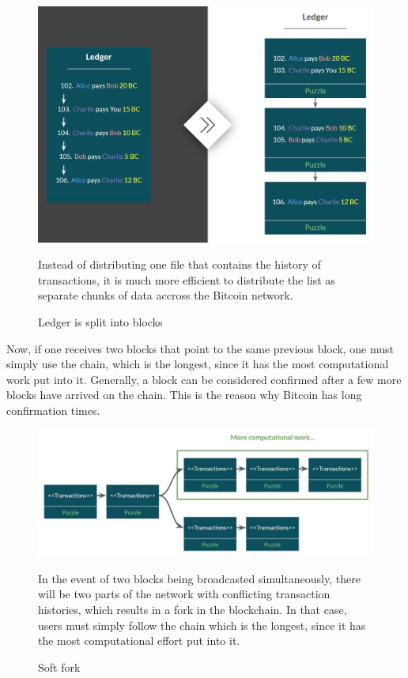 \documentclass[a4paper, 12pt]{report}
\begin{document}
\begin{figure}[H]
	\includegraphics[width=\textwidth]{04_Ledger_Split}
	\caption{Ledger is split into blocks}
	\medskip
	\small Instead of distributing one file that contains the history of transactions, it is much more efficient to distribute the list as separate chunks of data accross the Bitcoin network.
	\label{fig:04_Ledger_Split}
\end{figure}

\par Now, if one receives two blocks that point to the same previous block, one must simply use the chain, which is the longest, since it has the most computational work put into it. Generally, a block can be considered confirmed after a few more blocks have arrived on the chain. This is the reason why Bitcoin has long confirmation times.\cite{grant}

\begin{figure}[H]
	\includegraphics[width=\textwidth]{05_Soft_Fork}
	\caption{Soft fork}
	\medskip
	\small In the event of two blocks being broadcasted simultaneously, there will be two parts of the network with conflicting transaction histories, which results in a fork in the blockchain. In that case, users must simply follow the chain which is the longest, since it has the most computational effort put into it.
	\label{fig:05_Soft_Fork}
\end{figure}
\end{document}

